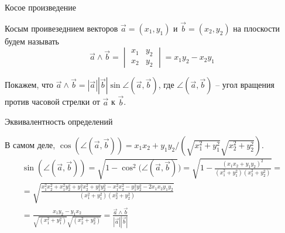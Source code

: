 \documentclass[12pt,aspectratio=169,svgnames]{beamer}
\begin{document}
\begin{frame}{Косое произведение}

	\begin{defn}

		\alert{Косым проивезеднием} векторов $\vec{a} = (x_1, y_1)$ и $\vec{b} = (x_2, y_2)$ на плоскости будем называть
		\[ \vec{a} \wedge \vec{b} =  \begin{vmatrix} x_1 & y_2 \\ x_2 & y_2  \end{vmatrix} = x_1 y_2 - x_2 y_1\]

	\end{defn}

	Покажем, что $\vec{a} \wedge \vec{b} = |\vec{a}| |\vec{b}| \sin{\angle(\vec{a}, \vec{b})}$, где $\angle(\vec{a}, \vec{b})$ -- угол
	вращения против часовой стрелки от $\vec{a}$ к $\vec{b}$.

\end{frame}

\begin{frame}{Эквивалентность определений}

	В самом деле, $\cos(\angle(\vec{a}, \vec{b})) = x_1 x_2 + y_1 y_2 / (\sqrt{x_1^2 + y_1^2}\sqrt{x_2^2 + y_2^2})$.
	\begin{multline*} \sin(\angle(\vec{a},\vec{b})) = \sqrt{1 - \cos^2({\angle(\vec{a}, \vec{b})}}) = \sqrt{1 - \frac{(x_1 x_2 + y_1 y_2)^2}{(x_1^2 + y_1^2)(x_2^2 + y_2^2)}} =\\= \sqrt{\frac{x_1^2 x_2^2 + x_1^2 y_2^2 + y_1^2 x_2^2 + y_1^2 y_2^2 - x_1^2 x_2^2 - y_1^2 y_2^2 - 2 x_1 x_2 y_1 y_2 }{(x_1^2 + y_1^2)(x_2^2 + y_2^2)}} \\= \frac{x_1 y_2 - y_1 x_2}{\sqrt{(x_1^2 + y_1^2)}\sqrt{(x_2^2 + y_2^2)}} = \frac{\vec{a} \wedge \vec{b}}{|\vec{a}||\vec{b}|} \end{multline*}

\end{frame}
\end{document}
